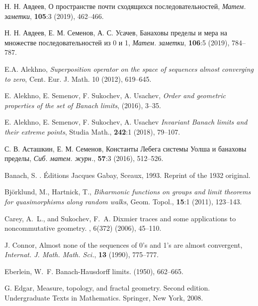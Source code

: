 \documentclass[12pt]{article}
\begin{document}
%


\begin{thebibliography}{10}
Н. Н. Авдеев, О пространстве почти сходящихся последовательностей,
\textit{Матем. заметки}, \textbf{105}:3 (2019),  462--466.

Н. Н. Авдеев, Е. М. Семенов, А. С. Усачев, Банаховы пределы и мера на множестве последовательностей из 0 и 1,
\textit{Матем. заметки}, \textbf{106}:5 (2019),  784--787.

{ E.A. Alekhno}, {\it Superposition operator on the space of sequences almost  converging to zero}, Cent. Eur. J. Math. {10}
 (2012), 619--645.

{ E. Alekhno, E. Semenov, F. Sukochev, A. Usachev},
\newblock  \textit{Order and geometric properties of the set of Banach
limits},
  (2016),  3--35.

E. Alekhno, E. Semenov, F. Sukochev, A. Usachev \textit{Invariant Banach limits and their extreme points}, Studia Math., \textbf{242}:1 (2018), 79--107.

С. В. Асташкин, Е. М. Семенов,  Константы Лебега системы Уолша и банаховы пределы, \emph{Сиб. матем. журн.}, \textbf{57}:3 (2016), 512--526.

{\sc Banach, S.}
.
\newblock \'Editions Jacques Gabay, Sceaux, 1993.
\newblock Reprint of the 1932 original.

Bj\"orklund, M., Hartnick, T., \textit{Biharmonic functions on groups and limit theorems for quasimorphisms along random walks}, Geom. Topol., \textbf{15}:1 (2011), 123--143.

{\sc Carey, A.~L., and Sukochev, F.~A.}
\newblock Dixmier traces and some applications to noncommutative geometry.
, 6(372) (2006), 45--110.

J. Connor, Almost none of the sequences of 0's and 1's are almost
convergent, \textit{Internat. J. Math. Math. Sci.}, \textbf{13} (1990), 775--777.

{\sc Eberlein, W.~F.}
\newblock Banach-{H}ausdorff limits.
 (1950), 662--665.

G. Edgar, Measure, topology, and fractal geometry. Second edition. Undergraduate Texts in Mathematics. Springer, New York, 2008.


\end{thebibliography}
\end{document}
